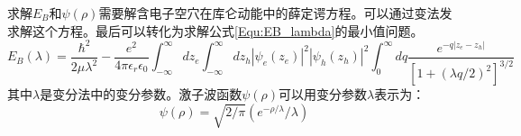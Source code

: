 求解$E_B$和$\psi(\rho)$需要解含电子空穴在库仑动能中的薛定谔方程\cite{mares1993modeling}。可以通过变法发求解这个方程\cite{miller1985electric, mares1993modeling}。最后可以转化为求解公式\ref{Equ:EB_lambda}的最小值问题。
\begin{equation}
\label{Equ:EB_lambda}
E_B(\lambda)=\frac{\hbar^2}{2\mu\lambda^2}-\frac{e^2}{4\pi\epsilon_r\epsilon_0}\int_{ - \infty }^{ \infty } {dz_e}\int_{ - \infty }^{ \infty } {dz_h	\left| \psi_e(z_e) \right|^2\left| \psi_h(z_h) \right|^2}\int_{ 0 }^{ \infty }{dq\frac{e^{-q\left| z_e-z_h \right|}}{\left[1+\left( \lambda q/2 \right) ^2 \right]^{3/2}}}
\end{equation}
其中$\lambda$是变分法中的变分参数。激子波函数$\psi(\rho)$可以用变分参数$\lambda$表示为：
\begin{equation}
\label{Equ:psirho}
\psi(\rho)=\sqrt{2/\pi}\left(e^{-\rho/\lambda}/\lambda \right)
\end{equation}

